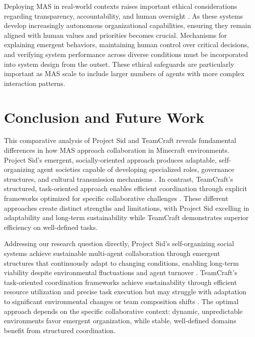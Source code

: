 \documentclass[a4paper, 12pt]{article}
\begin{document}
Deploying MAS in real-world contexts raises important ethical considerations regarding transparency, accountability, and human oversight \autocite{chen2024sagentsselforganizingagentsopenended}. As these systems develop increasingly autonomous organizational capabilities, ensuring they remain aligned with human values and priorities becomes crucial. Mechanisms for explaining emergent behaviors, maintaining human control over critical decisions, and verifying system performance across diverse conditions must be incorporated into system design from the outset. These ethical safeguards are particularly important as MAS scale to include larger numbers of agents with more complex interaction patterns.

\section{Conclusion and Future Work}

This comparative analysis of Project Sid and TeamCraft reveals fundamental differences in how MAS approach collaboration in Minecraft environments. Project Sid's emergent, socially-oriented approach produces adaptable, self-organizing agent societies capable of developing specialized roles, governance structures, and cultural transmission mechanisms \autocite{al2024projectsidmanyagentsimulations}. In contrast, TeamCraft's structured, task-oriented approach enables efficient coordination through explicit frameworks optimized for specific collaborative challenges \autocite{long2024teamcraftbenchmarkmultimodalmultiagent}. These different approaches create distinct strengths and limitations, with Project Sid excelling in adaptability and long-term sustainability while TeamCraft demonstrates superior efficiency on well-defined tasks.

Addressing our research question directly, Project Sid's self-organizing social systems achieve sustainable multi-agent collaboration through emergent structures that continuously adapt to changing conditions, enabling long-term viability despite environmental fluctuations and agent turnover \autocite{al2024projectsidmanyagentsimulations}. TeamCraft's task-oriented coordination frameworks achieve sustainability through efficient resource utilization and precise task execution but may struggle with adaptation to significant environmental changes or team composition shifts \autocite{long2024teamcraftbenchmarkmultimodalmultiagent}. The optimal approach depends on the specific collaborative context: dynamic, unpredictable environments favor emergent organization, while stable, well-defined domains benefit from structured coordination.
\end{document}
